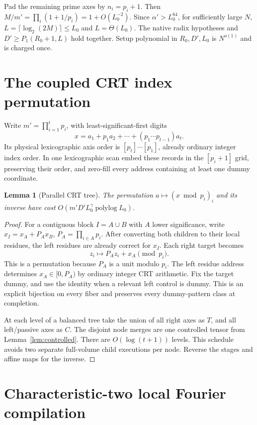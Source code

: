 \documentclass[11pt]{article}
\newtheorem{lemma}[theorem]{Lemma}
\newcommand{\polylog}{\operatorname{polylog}}
\begin{document}
Pad the remaining prime axes by $n_i=p_i+1$. Then
$M/m'=\prod_i(1+1/p_i)=1+O(L_0^{-2})$.
Since $\alpha'>L_0^{64}$, for sufficiently large $N$,
$L=\lceil\log_2(2M)\rceil\le L_0$ and $L=\Theta(L_0)$.
The native radix hypotheses and $D'\ge P_1(R_0+1,L)$ hold together.
Setup polynomial in $R_0,D',L_0$ is $N^{o(1)}$ and is charged once.

\section{The coupled CRT index permutation}

Write $m'=\prod_{i=1}^t p_i$, with least-significant-first digits
\[
 x=a_1+p_1a_2+\cdots+(p_1\cdots p_{t-1})a_t.
\]
Its physical lexicographic axis order is $[p_t]\cdots[p_1]$, already
ordinary integer index order. In one lexicographic scan embed these
records in the $[p_i+1]$ grid, preserving their order, and zero-fill
every address containing at least one dummy coordinate.

\begin{lemma}[Parallel CRT tree]
\label{lem:crt}
The permutation $a\mapsto(x\bmod p_i)_i$ and its inverse have cost
$O(m'D'L_0^\gamma\polylog L_0)$.
\end{lemma}
\begin{proof}
For a contiguous block $I=A\cup B$ with $A$ lower significance,
write $x_I=x_A+P_Ax_B$, $P_A=\prod_{i\in A}p_i$.
After converting both children to their local residues, the left
residues are already correct for $x_I$. Each right target becomes
\[
 z_i\longmapsto P_Az_i+x_A\pmod{p_i}.
\]
This is a permutation because $P_A$ is a unit modulo $p_i$.
The left residue address determines $x_A\in[0,P_A)$ by ordinary
integer CRT arithmetic. Fix the target dummy, and use the identity
when a relevant left control is dummy. This is an explicit bijection
on every fiber and preserves every dummy-pattern class at completion.

At each level of a balanced tree take the union of all right axes as
$T$, and all left/passive axes as $C$. The disjoint node merges are
one controlled tensor from Lemma~\ref{lem:controlled}. There are
$O(\log(t+1))$ levels. This schedule avoids two separate full-volume
child executions per node. Reverse the stages and affine maps for
the inverse.
\end{proof}

\section{Characteristic-two local Fourier compilation}
\end{document}
